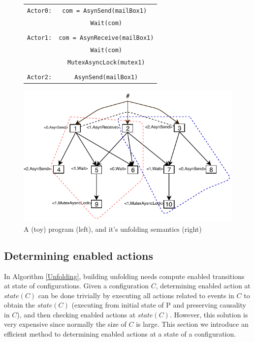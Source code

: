 \documentclass[a4paper,11pt]{article}
\theoremstyle{break}
\newcommand{\code}[1]{\texttt{#1}}
\begin{document}
\begin{figure}[H]
\label{fig:unfoldSematics}

\begin{multicols}{2}
			\centering
			\begin{tabular}{c c}
				\\
				\code{Actor0:}&\code{com = AsynSend(mailBox1) }\\&\code{Wait(com)} \\\\
				\code{Actor1:}&\code{com = AsynReceive(mailBox1)}\\&\code{Wait(com)}\\&\code{MutexAsyncLock(mutex1)} \\\\
				\code{Actor2:}&\code{AsynSend(mailBox1)}
			\end{tabular}

\label{table:ta}

\includegraphics[scale = 0.8]{Figures/unfolding.pdf}

\end{multicols}
\caption{A (toy) program (left), and it's unfolding  semantics (right)}

\end{figure}
\subsection{Determining enabled actions}
In Algorithm \ref{Unfolding}, building unfolding needs compute enabled transitions at state of configurations. Given a configuration $C$, determining enabled action at $state(C)$ can be done trivially by executing all actions related to events in $C$ to obtain the $state(C)$ (executing from initial state of P and preserving causality in $C$), and then checking enabled actions at $state(C)$. However, this solution is very expensive since normally the size of $C$ is large. This section we introduce an efficient method to determining enabled actions at a state of a configuration. 
\end{document}
